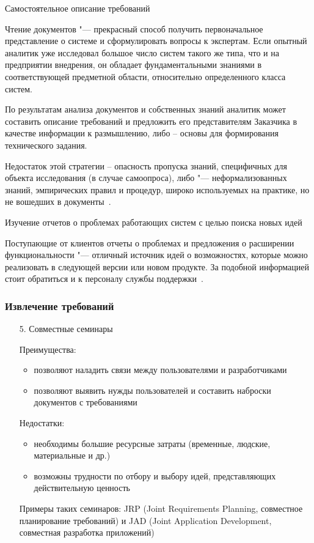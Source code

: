 \documentclass{../industrial-development}
\begin{document}
\lecturenotes

\alert{Самостоятельное описание требований}

Чтение документов "--- прекрасный способ получить первоначальное представление о системе и сформулировать вопросы к экспертам. Если опытный аналитик уже исследовал большое число систем такого же типа, что и на предприятии внедрения, он обладает фундаментальными знаниями в соответствующей предметной области, относительно определенного класса систем.

По результатам анализа документов и собственных знаний аналитик может составить описание требований и предложить его представителям Заказчика в качестве информации к размышлению, либо – основы для формирования технического задания.

Недостаток этой стратегии – опасность пропуска знаний, специфичных для объекта исследования (в случае самоопроса), либо "--- неформализованных знаний, эмпирических правил и процедур, широко используемых на практике, но не вошедших в документы~\cite[с.~33]{Maglinec}.

\alert{Изучение отчетов о проблемах работающих систем с целью поиска новых идей}

Поступающие от клиентов отчеты о проблемах и предложения о расширении функциональности "--- отличный источник идей о возможностях, которые можно реализовать в следующей версии или новом продукте. За подобной информацией стоит обратиться и к персоналу службы поддержки~\cite[с.~48]{Wiegers}.



\begin{frame} \frametitle{Извлечение требований}
\begin{itemize}

\item[5.] Совместные семинары 

Преимущества:
\begin{itemize} 
\item позволяют наладить связи между пользователями и разработчиками
\item позволяют выявить нужды пользователей и составить наброски документов с требованиями
\end{itemize}
Недостатки:
\begin{itemize}
\item необходимы большие ресурсные затраты (временные, людские, материальные и др.)
\item возможны трудности по отбору и выбору идей, представляющих действительную ценность
\end{itemize}

Примеры таких семинаров: \alert{JRP} (Joint Requirements Planning, совместное планирование требований) и \alert{JAD} (Joint Application Development, совместная разработка приложений)


\end{itemize}
\end{frame}
\lecturenotes
\end{document}
